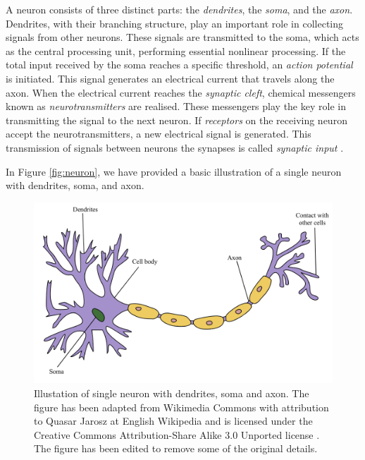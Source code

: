 \documentclass[a4paper, UKenglish, 11pt]{uiomaster}
\begin{document}
A neuron consists of three distinct parts: the \emph{dendrites}, the \emph{soma}, and the \emph{axon}. Dendrites, with their branching structure, play an important role in collecting signals from other neurons. These signals are transmitted to the soma, which acts as the central processing unit, performing essential nonlinear processing. If the total input received by the soma reaches a specific threshold, an \emph{action potential} is initiated. This signal generates an electrical current that travels along the axon. When the electrical current reaches the \emph{synaptic cleft}, chemical messengers known as \emph{neurotransmitters} are realised. These messengers play the key role in transmitting the signal to the next neuron. If \emph{receptors} on the receiving neuron accept the neurotransmitters, a new electrical signal is generated. This transmission of signals between neurons the synapses is called \emph{synaptic input} \cite{gerstner2014neuronal}.

In Figure \ref{fig:neuron}, we have provided a basic illustration of a single neuron with dendrites, soma, and axon.

\begin{figure}
    \centering
    \includegraphics[width=1.0\linewidth]{figures/Neuron_wikimedia.png}
    \caption{Illustation of single neuron with dendrites, soma and axon. The figure has been adapted from Wikimedia Commons with attribution to Quasar Jarosz at English Wikipedia and is licensed under the Creative Commons Attribution-Share Alike 3.0 Unported license \cite{wikimedia-neuron}. The figure has been edited to remove some of the original details.}
    \label{fig:action_potential}
\end{figure}


\end{document}
